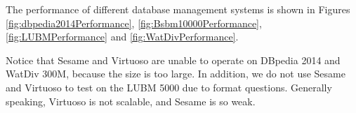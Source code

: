 \documentclass[titlepage, a4paper, 12pt]{article}
\begin{document}
\begin{comment}
Table \ref{table:loading} shows the index size and loading time of the datasets
for different systems.

\begin{table}[htcp]
\small
\begin{threeparttable}
\begin{tabular}{|c||c|c|c||c|c|c|}
\hline
 & \multicolumn{3}{c||}{Index Size(KB)}& \multicolumn{3}{c|}{Loading Time(ms)}\\
\hline
\hline
 Datasets & gStore & Jena& Virtuoso& gStore & Jena& Virtuoso\\
  \hline
  DBpedia 2014 & 42,415,852&	23,151,272 &	-\tnote{$1$} & 8,639,666	&15,555,000	& -	\\
  \hline
  Bsbm 10000 & 1,814,480 & 718,024 & 2,080,000 & 244,153 & 76,000 & 59999  \\
  \hline
  LUBM 500  &2,171,084 &1,022,528	&	38,000,000 &	291,382&	94,000 &100,532	 \\
  \hline
  WatDiv 100M & 26,566,780&	13,286,608	 &	8,615,100 & 7,879,602	&20,969,000	&16,981,470 \\
  \hline
  \end{tabular}
    \begin{tablenotes}
  \small
  \item[$1$] ``-'' means that loading does not terminate in 10 hour
  \end{tablenotes}
  \end{threeparttable}
  \caption{Offline Performance}
  \label{table:loading}
\end{table}
\end{comment}

The performance of different database management systems is shown in Figures \ref{fig:dbpedia2014Performance}, \ref{fig:Bsbm10000Performance}, \ref{fig:LUBMPerformance} and \ref{fig:WatDivPerformance}.

Notice that Sesame and Virtuoso are unable to operate on DBpedia 2014 and
WatDiv 300M, because the size is too large. In addition, we do not use
Sesame and Virtuoso to test on the LUBM 5000 due to format questions. 
Generally speaking, Virtuoso is not scalable, and Sesame is so weak. \\
\end{document}
